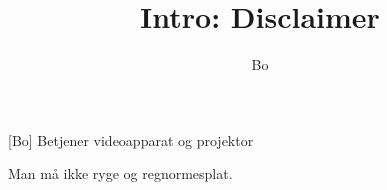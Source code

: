 \documentclass[danish]{article}
\title{Intro: Disclaimer}
\author{Bo}
\begin{document}
\maketitle

\begin{roles}
  [Bo] Betjener videoapparat og projektor
\end{roles}

\begin{sketch}

\scene Man må ikke ryge og regnormesplat.

\end{sketch}
\end{document}

